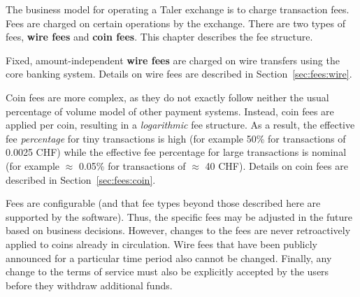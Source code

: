 \documentclass[10pt,a4paper,oneside]{book}
\begin{document}
The business model for operating a Taler exchange is to charge transaction
fees.  Fees are charged on certain operations by the exchange.  There are two
types of fees, {\bf wire fees} and {\bf coin fees}.  This chapter describes
the fee structure.

Fixed, amount-independent {\bf wire fees} are charged on wire transfers using
the core banking system.  Details on wire fees are described in
Section~\ref{sec:fees:wire}.

Coin fees are more complex, as they do not exactly follow neither the usual
percentage of volume model of other payment systems.  Instead, coin fees are
applied per coin, resulting in a {\em logarithmic} fee structure.  As a
result, the effective fee {\em percentage} for tiny transactions is high (for
example 50\% for transactions of 0.0025 CHF) while the effective fee
percentage for large transactions is nominal (for example $\approx$ 0.05\% for
transactions of $\approx$ 40 CHF). Details on coin fees are described in
Section~\ref{sec:fees:coin}.

Fees are configurable (and that fee types beyond those described here are
supported by the software). Thus, the specific fees may be adjusted in the
future based on business decisions.  However, changes to the fees are never
retroactively applied to coins already in circulation.  Wire fees that have
been publicly announced for a particular time period also cannot be changed.
Finally, any change to the terms of service must also be explicitly accepted
by the users before they withdraw additional funds.




%
\end{document}
